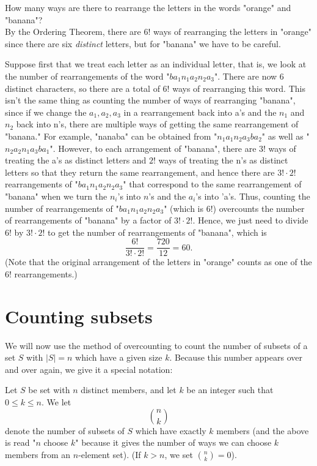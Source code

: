 \documentclass[11pt,dvipsnames]{book}
\numberwithin{figure}{section} %
\numberwithin{table}{section} %
\begin{document}
\begin{example}
How many ways are there to rearrange the letters in the words "orange" and "banana"? \\

By the Ordering Theorem, there are $6!$ ways of rearranging the letters in "orange" since there are six {\it distinct} letters, but for "banana" we have to be careful.

Suppose first that we treat each letter as an individual letter, that is, we look at the number of rearrangements of the word "$ba_{1}n_{1}a_{2}n_{2}a_{3}$". There are now 6 distinct characters, so there are a total of $6!$ ways of rearranging this word. This isn't the same thing as counting the number of ways of rearranging "banana", since if we change the $a_{1},a_{2},a_{3}$ in a rearrangement back into a's and the $n_{1}$ and $n_{2}$ back into n's, there are multiple ways of getting the same rearrangement of "banana." For example, "nanaba" can be obtained from "$n_{1}a_{1}n_{2}a_{3}ba_{2}$" as well as "$n_{2}a_{2}n_{1}a_{3}ba_{1}$". However, to each arrangement of "banana", there are $3!$ ways of treating the a's as distinct letters and $2!$ ways of treating the n's as distinct letters so that they return the same rearrangement, and hence there are $3!\cdot 2!$ rearrangements of "$ba_{1}n_{1}a_{2}n_{2}a_{3}$" that correspond to the same rearrangement of "banana" when we turn the $n_i$'s into $n$'s and the $a_i$'s into 'a's. Thus,  counting the number of rearrangements of "$ba_{1}n_{1}a_{2}n_{2}a_{3}$"  (which is $6!$) overcounts the number of rearrangements of "banana" by a factor of $3!\cdot 2!$. Hence, we just need to divide $6!$ by $3!\cdot 2!$ to get the number of rearrangements of "banana", which is
\[
\frac{6!}{3!\cdot 2!} = \frac{720}{12} = 60.
\]
(Note that the original arrangement of the letters in "orange" counts as one of the
$6!$ rearrangements.)
\end{example}

\section{Counting subsets}

We will now use the method of overcounting to count the number of subsets of a set $S$ with $|S|=n$ which have a given size $k$. Because this number appears over and over again, we give it a special notation:\\

\begin{definition}
Let $S$ be set with $n$ distinct members, and let $k$ be an integer such that $0\leq k\leq n$. We let
\[
{n \choose k}
\]
denote the number of subsets of $S$ which have exactly $k$ members (and the above is read "$n$ choose $k$" because it gives the number of ways we can choose $k$ members from an $n$-element set). (If $k>n$, we set ${n \choose k}=0$).
\end{definition}
\end{document}
